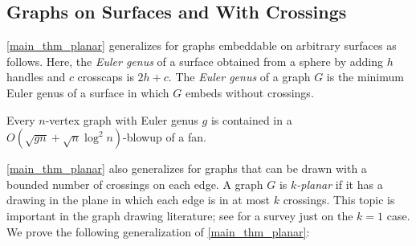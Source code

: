 \documentclass{patmorin}
\renewcommand{\geq}{\geqslant}
\renewcommand{\leq}{\leqslant}
\newcommand{\david}[1]{{\color{orange} David: #1}}
\newcommand{\defin}[1]{\emph{\textcolor{brightmaroon}{#1}}}
\DeclareMathOperator{\pw}{pw}
\begin{document}


\subsection{Graphs on Surfaces and With Crossings}

\cref{main_thm_planar} generalizes for graphs embeddable on arbitrary surfaces as follows. Here, the \defin{Euler genus} of a surface obtained from a sphere by adding $h$ handles and $c$ crosscaps is $2h+c$. The \defin{Euler genus} of a graph $G$ is the minimum Euler genus of a surface in which $G$ embeds without crossings.

\begin{thm}\label{main_thm_genus}
  Every $n$-vertex graph with Euler genus $g$ is contained in a $O(\sqrt{gn}+\sqrt{n}\log^2 n)$-blowup of a fan.
\end{thm}

\cref{main_thm_planar} also generalizes for graphs that can be drawn with a bounded number of crossings on each edge. A graph $G$ is \defin{$k$-planar} if it has a drawing in the plane in which each edge is in at most $k$ crossings. This topic is important in the graph drawing literature; see \cite{KLM17} for a survey just on the $k=1$ case. We prove the following generalization of \cref{main_thm_planar}:
\end{document}
